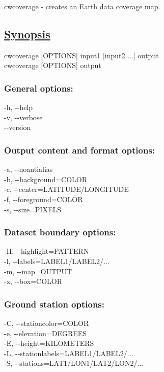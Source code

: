    cwcoverage - creates an Earth data coverage map.  
\subsection*{\underline{Synopsis}}


  cwcoverage [OPTIONS] input1 [input2 ...] output \\ 
 cwcoverage [OPTIONS] output \\ 

\subsubsection*{General options:}


  -h, -{-}help \\ 
 -v, -{-}verbose \\ 
 -{-}version \\ 

\subsubsection*{Output content and format options:}


  -a, -{-}noantialias \\ 
 -b, -{-}background=COLOR \\ 
 -c, -{-}center=LATITUDE/LONGITUDE \\ 
 -f, -{-}foreground=COLOR \\ 
 -s, -{-}size=PIXELS \\ 

\subsubsection*{Dataset boundary options:}


  -H, -{-}highlight=PATTERN \\ 
 -l, -{-}labels=LABEL1/LABEL2/... \\ 
 -m, -{-}map=OUTPUT \\ 
 -x, -{-}box=COLOR \\ 

\subsubsection*{Ground station options:}


  -C, -{-}stationcolor=COLOR \\ 
 -e, -{-}elevation=DEGREES \\ 
 -E, -{-}height=KILOMETERS \\ 
 -L, -{-}stationlabels=LABEL1/LABEL2/... \\ 
 -S, -{-}stations=LAT1/LON1/LAT2/LON2/... \\ 

